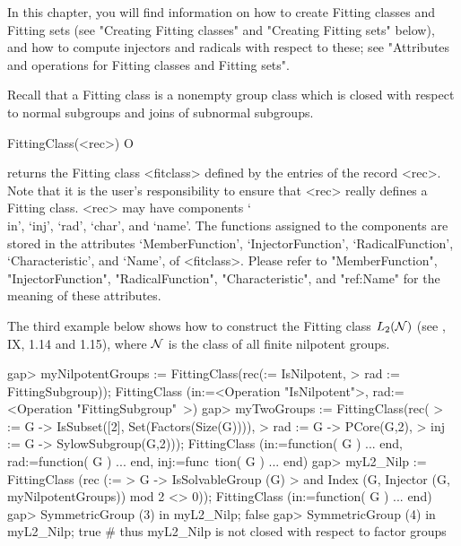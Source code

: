 
In this chapter, you will find information on how to create 
Fitting classes and Fitting sets (see "Creating Fitting classes" and
"Creating Fitting sets" below), and how to compute injectors and radicals
with respect to these;  see "Attributes and operations for Fitting classes
and Fitting sets".


\null


Recall that a Fitting class is a nonempty group class which is closed with respect
to normal subgroups and joins of subnormal subgroups.

\>FittingClass(<rec>) O

returns the Fitting class <fitclass> defined by the entries of the record
<rec>. Note that it is the user's responsibility to ensure that <rec> really
defines a Fitting class.
<rec> may have components `\\in', `inj', `rad', `char', and `name'. The
functions assigned to the components are stored in the attributes
`MemberFunction', `InjectorFunction',
`RadicalFunction', `Characteristic', and `Name', of <fitclass>. Please refer
to "MemberFunction",  "InjectorFunction", "RadicalFunction",
"Characteristic", and "ref:Name" for the meaning of these attributes.


 The third example below shows how to construct
the Fitting class $L_2({\cal N})$ (see \cite{DH92}, IX, 1.14 and 1.15), where
$\cal N$ is the class of all finite nilpotent groups.

\beginexample
gap> myNilpotentGroups := FittingClass(rec(\in := IsNilpotent,
>    rad := FittingSubgroup));
FittingClass (in:=<Operation "IsNilpotent">, rad:=<Operation "FittingSubgroup"\
>)
gap> myTwoGroups := FittingClass(rec(
>    \in := G -> IsSubset([2], Set(Factors(Size(G)))), 
>    rad :=  G -> PCore(G,2),
>    inj := G -> SylowSubgroup(G,2)));
FittingClass (in:=function( G ) ... end, rad:=function( G ) ... end, inj:=func\
tion( G ) ... end)
gap> myL2_Nilp := FittingClass (rec (\in := 
>     G -> IsSolvableGroup (G) 
>          and Index (G, Injector (G, myNilpotentGroups)) mod 2 <> 0));
FittingClass (in:=function( G ) ... end)
gap> SymmetricGroup (3) in myL2_Nilp;
false
gap> SymmetricGroup (4) in myL2_Nilp;
true   # thus myL2_Nilp is not closed with respect to factor groups
\endexample

